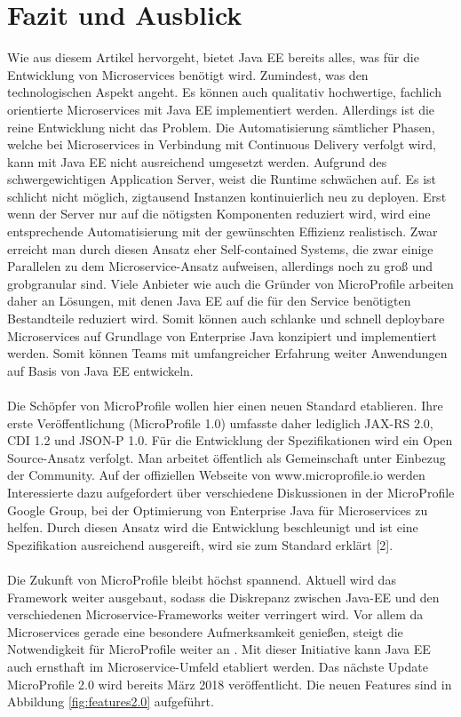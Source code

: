 \section{Fazit und Ausblick}
Wie aus diesem Artikel hervorgeht, bietet Java EE bereits alles, was für die Entwicklung von Microservices benötigt wird. Zumindest, was den technologischen Aspekt angeht. Es können auch qualitativ hochwertige, fachlich orientierte Microservices mit Java EE implementiert werden. Allerdings ist die reine Entwicklung nicht das Problem. Die Automatisierung sämtlicher Phasen, welche bei Microservices in Verbindung mit Continuous Delivery verfolgt wird, kann mit Java EE nicht ausreichend umgesetzt werden. Aufgrund des schwergewichtigen Application Server, weist die Runtime schwächen auf. Es ist schlicht nicht möglich, zigtausend Instanzen kontinuierlich neu zu deployen. Erst wenn der Server nur auf die nötigsten Komponenten reduziert wird, wird eine entsprechende Automatisierung mit der gewünschten Effizienz realistisch. Zwar erreicht man durch diesen Ansatz eher Self-contained Systems, die zwar einige Parallelen zu dem Microservice-Ansatz aufweisen, allerdings noch zu groß und grobgranular sind. Viele Anbieter wie auch die Gründer von MicroProfile arbeiten daher an Lösungen, mit denen Java EE auf die für den Service benötigten Bestandteile reduziert wird. Somit können auch schlanke und schnell deploybare Microservices auf Grundlage von Enterprise Java konzipiert und implementiert werden. Somit können Teams mit umfangreicher Erfahrung weiter Anwendungen auf Basis von Java EE entwickeln. \\ \\
Die Schöpfer von MicroProfile wollen hier einen neuen Standard etablieren. Ihre erste Veröffentlichung (MicroProfile 1.0) umfasste daher lediglich JAX-RS 2.0, CDI 1.2 und JSON-P 1.0.
Für die Entwicklung der Spezifikationen wird ein Open Source-Ansatz verfolgt. Man arbeitet öffentlich als Gemeinschaft unter Einbezug der Community. Auf der offiziellen Webseite von www.microprofile.io werden Interessierte dazu aufgefordert über verschiedene Diskussionen in der MicroProfile Google Group, bei der Optimierung von Enterprise Java für Microservices zu helfen. Durch diesen Ansatz wird die Entwicklung beschleunigt und ist eine Spezifikation ausreichend ausgereift, wird sie zum Standard erklärt [2].  \\ \\
Die Zukunft von MicroProfile bleibt höchst spannend. Aktuell wird das Framework weiter ausgebaut, sodass die Diskrepanz zwischen Java-EE und den verschiedenen Microservice-Frameworks weiter verringert wird. Vor allem da Microservices gerade eine besondere Aufmerksamkeit genießen, steigt die Notwendigkeit für MicroProfile weiter an \cite{LarsRowekamp.2018}. Mit dieser Initiative kann Java EE auch ernsthaft im Microservice-Umfeld etabliert werden. Das nächste Update MicroProfile 2.0 wird bereits März 2018 veröffentlicht. Die neuen Features sind in Abbildung \ref{fig:features2.0} aufgeführt. 

